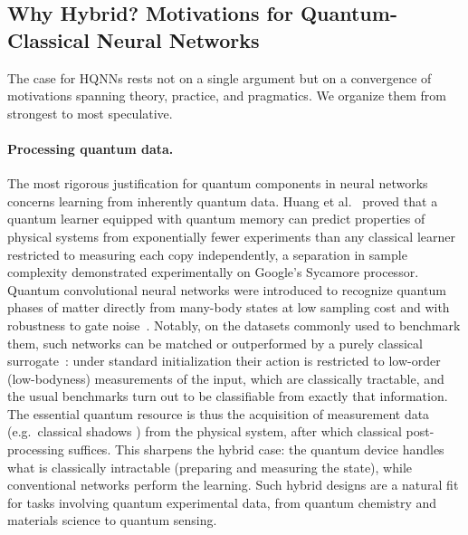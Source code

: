 \documentclass[aps,10pt,groupedaddress,prx,superscriptaddress,twocolumn,balancelastpage, tightenlines]{revtex4-2}
\theoremstyle{plain}  %
\begin{document}
\subsection{Why Hybrid? Motivations for Quantum-Classical Neural Networks}
\label{subsec:why_hybrid}

The case for \glspl{HQNN} rests not on a single argument but on a convergence
of motivations spanning theory, practice, and pragmatics. We organize them
from strongest to most speculative.

\paragraph{Processing quantum data.}
The most rigorous justification for quantum components in neural networks concerns learning from inherently quantum data. Huang et al.~\cite{Huang2022Science} proved that a quantum learner equipped with quantum memory can predict properties of physical systems from exponentially fewer experiments than any classical learner restricted to measuring each copy independently, a separation in sample complexity demonstrated experimentally on Google's Sycamore processor. Quantum convolutional neural networks were introduced to recognize quantum phases of matter directly from many-body states at low sampling cost and with robustness to gate noise~\cite{cong2019quantum}. Notably, on the datasets commonly used to benchmark them, such networks can be matched or outperformed by a purely classical surrogate~\cite{bermejo_quantum_2026}: under standard initialization their action is restricted to low-order (low-bodyness) measurements of the input, which are classically tractable, and the usual benchmarks turn out to be classifiable from exactly that information. The essential quantum resource is thus the acquisition of measurement data (e.g.\ classical shadows \cite{aaronson_shadow_2018}) from the physical system, after which classical post-processing suffices. This sharpens the hybrid case: the quantum device handles what is classically intractable (preparing and measuring the state), while conventional networks perform the learning. Such hybrid designs are a natural fit for tasks involving quantum experimental data, from quantum chemistry and materials science to quantum sensing.
\end{document}
